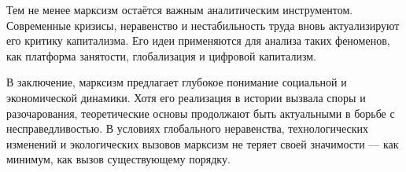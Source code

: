 \documentclass[14pt, russian]{matmex-diploma-custom}
\begin{document}
Тем не менее марксизм остаётся важным аналитическим инструментом. Современные кризисы, неравенство и нестабильность труда вновь актуализируют его критику капитализма. Его идеи применяются для анализа таких феноменов, как платформа занятости, глобализация и цифровой капитализм.

В заключение, марксизм предлагает глубокое понимание социальной и экономической динамики. Хотя его реализация в истории вызвала споры и разочарования, теоретические основы продолжают быть актуальными в борьбе с несправедливостью. В условиях глобального неравенства, технологических изменений и экологических вызовов марксизм не теряет своей значимости — как минимум, как вызов существующему порядку.


\setmonofont{CMU Typewriter Text}


\end{document}
